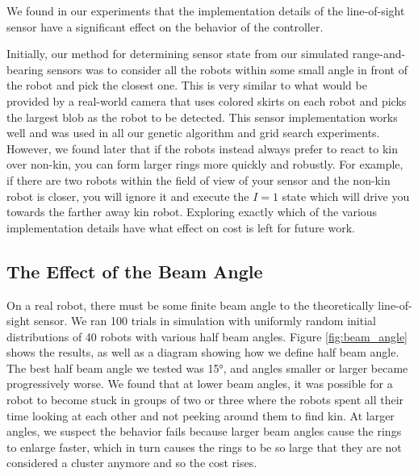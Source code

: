 \documentclass[conference]{IEEEtran}
\begin{document}
    We found in our experiments that the implementation details of the line-of-sight sensor have a significant effect on the behavior of the controller.

    Initially, our method for determining sensor state from our simulated range-and-bearing sensors was to consider all the robots within some small angle in front of the robot and pick the closest one. This is very similar to what would be provided by a real-world camera that uses colored skirts on each robot and picks the largest blob as the robot to be detected. This sensor implementation works well and was used in all our genetic algorithm and grid search experiments. However, we found later that if the robots instead always prefer to react to kin over non-kin, you can form larger rings more quickly and robustly. For example, if there are two robots within the field of view of your sensor and the non-kin robot is closer, you will ignore it and execute the $I=1$ state which will drive you towards the farther away kin robot. Exploring exactly which of the various implementation details have what effect on cost is left for future work.

  \subsection{The Effect of the Beam Angle} \label{sec:aperture_angle}

    On a real robot, there must be some finite beam angle to the theoretically line-of-sight sensor. We ran 100 trials in simulation with uniformly random initial distributions of 40 robots with various half beam angles. Figure \ref{fig:beam_angle} shows the results, as well as a diagram showing how we define half beam angle. The best half beam angle we tested was \ang{15}, and angles smaller or larger became progressively worse. We found that at lower beam angles, it was possible for a robot to become stuck in groups of two or three where the robots spent all their time looking at each other and not peeking around them to find kin. At larger angles, we suspect the behavior fails because larger beam angles cause the rings to enlarge faster, which in turn causes the rings to be so large that they are not considered a cluster anymore and so the cost rises.
\end{document}
